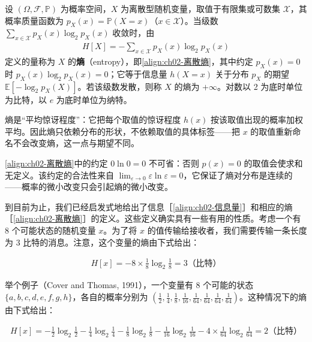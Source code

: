 \documentclass[../../main.tex]{subfiles}
\begin{document}
\begin{definition}[熵]\label{definition:ch02-熵}
设 $(\Omega,\mathcal{F},\mathbb{P})$ 为概率空间，$X$ 为离散型随机变量，取值于有限集或可数集 $\mathcal{X}$，其概率质量函数为 $p_X(x)=\mathbb{P}(X=x)$（$x\in\mathcal{X}$）。当级数 $\sum_{x\in\mathcal{X}}p_X(x)\log_2 p_X(x)$ 收敛时，由
\begin{align*}
  H[X]=-\sum_{x\in\mathcal{X}}p_X(x)\log_2 p_X(x)
\end{align*}
定义的量称为 $X$ 的\textbf{熵}（entropy），即\eqref{align:ch02-离散熵}，其中约定 $p_X(x)=0$ 时 $p_X(x)\log_2 p_X(x)=0$；它等于信息量 $h(X=x)$ 关于分布 $p_X$ 的期望 $\mathbb{E}[-\log_2 p_X(X)]$。若该级数发散，则称 $X$ 的熵为 $+\infty$。对数以 2 为底时单位为比特，以 $e$ 为底时单位为纳特。
\end{definition}

\begin{remark}
熵是“平均惊讶程度”：它把每个取值的惊讶程度 $h(x)$ 按该取值出现的概率加权平均。因此熵只依赖分布的形状，不依赖取值的具体标签——把 $x$ 的取值重新命名不会改变熵，这一点与期望不同。

\eqref{align:ch02-离散熵}中的约定 $0\ln0=0$ 不可省：否则 $p(x)=0$ 的取值会使求和无定义。该约定的合法性来自 $\lim_{\varepsilon\to0}\varepsilon\ln\varepsilon=0$，它保证了熵对分布是连续的——概率的微小改变只会引起熵的微小改变。
\end{remark}

到目前为止，我们已经启发式地给出了信息［\eqref{align:ch02-信息量}］和相应的熵［\eqref{align:ch02-离散熵}］的定义。这些定义确实具有一些有用的性质。考虑一个有 $8$ 个可能状态的随机变量 $x$。为了将 $x$ 的值传输给接收者，我们需要传输一条长度为 $3$ 比特的消息。注意，这个变量的熵由下式给出：

\begin{align}
  H[x] = -8\times\frac{1}{8}\log_2\frac{1}{8} = 3 \text{（比特）}
  \label{align:ch02-八状态熵}
\end{align}

举个例子（Cover and Thomas, 1991），一个变量有 $8$ 个可能的状态 $\{a,b,c,d,e,f,g,h\}$，各自的概率分别为 $\left(\frac{1}{2},\frac{1}{4},\frac{1}{8},\frac{1}{16},\frac{1}{64},\frac{1}{64},\frac{1}{64},\frac{1}{64}\right)$。这种情况下的熵由下式给出：

\begin{align}
  H[x] = -\frac{1}{2}\log_2\frac{1}{2} - \frac{1}{4}\log_2\frac{1}{4} - \frac{1}{8}\log_2\frac{1}{8} - \frac{1}{16}\log_2\frac{1}{16} - 4\times\frac{1}{64}\log_2\frac{1}{64} = 2 \text{（比特）}
  \label{align:ch02-非均匀熵}
\end{align}
\end{document}
